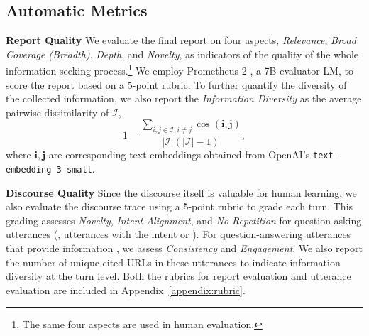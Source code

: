 \subsection{Automatic Metrics}
\label{sec:eval_metrics}
\noindent
\textbf{Report Quality}\quad
We evaluate the final report on four aspects, \textit{Relevance}, \textit{Broad Coverage (Breadth)}, \textit{Depth}, and \textit{Novelty}, as indicators of the quality of the whole information-seeking process.\footnote{The same four aspects are used in human evaluation.} We employ Prometheus 2 \citep{kim2024prometheus}, a 7B evaluator LM, to score the report based on a 5-point rubric. To further quantify the diversity of the collected information, we also report the \textit{Information Diversity} as the average pairwise dissimilarity of $\mathcal{I}$,
\begin{equation}\nonumber
    1-\frac{\sum_{i,j\in\mathcal{I},i\neq j}\operatorname{cos}(\mathbf{i}, \mathbf{j})}{|\mathcal{I}|(|\mathcal{I}|-1)},
\end{equation}
where $\mathbf{i},\mathbf{j}$ are corresponding text embeddings obtained from OpenAI's \texttt{text-embedding-3-small}.%



\noindent
\textbf{Discourse Quality}\quad
Since the discourse itself is valuable for human learning, we also evaluate the discourse trace using a 5-point rubric to grade each turn. This grading assesses \textit{Novelty}, \textit{Intent Alignment}, and \textit{No Repetition} for question-asking utterances (\ie, utterances with the intent  or ). For question-answering utterances that provide information%
, we assess \textit{Consistency} and \textit{Engagement}. We also report the number of unique cited URLs in these utterances to indicate information diversity at the turn level. %
Both the rubrics for report evaluation and utterance evaluation are included in Appendix~\ref{appendix:rubric}.